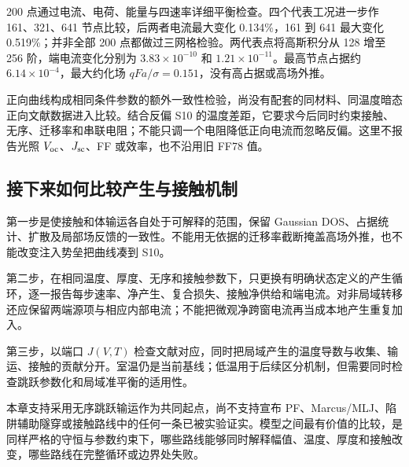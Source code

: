 \documentclass[11pt,a4paper]{article}
\begin{document}
200 {\cjkfont 点通过电流、电荷、能量与四速率详细平衡检查。四个代表工况进一步作}\allowbreak{} 161{\cjkfont 、}\allowbreak{}321{\cjkfont 、}\allowbreak{}641 {\cjkfont 节点比较，后两者电流最大变化}\allowbreak{} 0.134\%{\cjkfont ，}\allowbreak{}161 {\cjkfont 到}\allowbreak{} 641 {\cjkfont 最大变化}\allowbreak{} 0.519\%{\cjkfont ；并非全部}\allowbreak{} 200 {\cjkfont 点都做过三网格检验。两代表点将高斯积分从}\allowbreak{} 128 {\cjkfont 增至}\allowbreak{} 256 {\cjkfont 阶，端电流变化分别为}\allowbreak{} $3.83\times10^{-10}$ {\cjkfont 和}\allowbreak{} $1.21\times10^{-11}${\cjkfont 。最高节点占据约}\allowbreak{} $6.14\times10^{-4}${\cjkfont ，最大约化场}\allowbreak{} $qFa/\sigma=0.151${\cjkfont ，没有高占据或高场外推。}\allowbreak{}

{\cjkfont 正向曲线构成相同条件参数的额外一致性检验，尚没有配套的同材料、同温度暗态正向文献数据进入比较。结合反偏}\allowbreak{} S10 {\cjkfont 的温度差距，它要求今后同时约束接触、无序、迁移率和串联电阻；不能只调一个电阻降低正向电流而忽略反偏。这里不报告光照}\allowbreak{} $V_{\rm oc}${\cjkfont 、}\allowbreak{}$J_{\rm sc}${\cjkfont 、}\allowbreak{}FF {\cjkfont 或效率，也不沿用旧}\allowbreak{} FF78 {\cjkfont 值。}\allowbreak{}


\subsection{{\cjkfont 接下来如何比较产生与接触机制}\allowbreak{}}
{\cjkfont 第一步是使接触和体输运各自处于可解释的范围，保留}\allowbreak{} Gaussian DOS{\cjkfont 、占据统计、扩散及局部场反馈的一致性。不能用无依据的迁移率截断掩盖高场外推，也不能改变注入势垒把曲线凑到}\allowbreak{} S10{\cjkfont 。}\allowbreak{}

{\cjkfont 第二步，在相同温度、厚度、无序和接触参数下，只更换有明确状态定义的产生循环，逐一报告每步速率、净产生、复合损失、接触净供给和端电流。对非局域转移还应保留两端源项与相应内部电流；不能把微观净跨窗电流再当成本地产生重复加入。}\allowbreak{}

{\cjkfont 第三步，以端口}\allowbreak{} $J(V,T)$ {\cjkfont 检查文献对应，同时把局域产生的温度导数与收集、输运、接触的贡献分开。室温仍是当前基线；低温用于后续区分机制，但需要同时检查跳跃参数化和局域准平衡的适用性。}\allowbreak{}

{\cjkfont 本章支持采用无序跳跃输运作为共同起点，尚不支持宣布}\allowbreak{} PF{\cjkfont 、}\allowbreak{}Marcus/MLJ{\cjkfont 、陷阱辅助隧穿或接触路线中的任何一条已被实验证实。模型之间最有价值的比较，是同样严格的守恒与参数约束下，哪些路线能够同时解释幅值、温度、厚度和接触改变，哪些路线在完整循环或边界处失败。}\allowbreak{}
\end{document}
